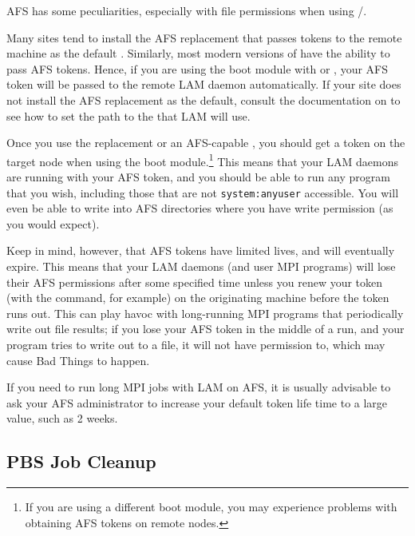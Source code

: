 AFS has some peculiarities, especially with file permissions when
using /.  

Many sites tend to install the AFS  replacement that passes
tokens to the remote machine as the default .  Similarly,
most modern versions of  have the ability to pass AFS tokens.
Hence, if you are using the  boot module with  or
, your AFS token will be passed to the remote LAM daemon
automatically.  If your site does not install the AFS replacement
 as the default, consult the documentation on
 to see how to set the path to the  that
LAM will use.

Once you use the replacement  or an AFS-capable ,
you should get a token on the target node when using the 
boot module.\footnote{If you are using a different boot module, you
  may experience problems with obtaining AFS tokens on remote nodes.}
This means that your LAM daemons are running with your AFS token, and
you should be able to run any program that you wish, including those
that are not {\tt system:anyuser} accessible.  You will even be able
to write into AFS directories where you have write permission (as you
would expect).

Keep in mind, however, that AFS tokens have limited lives, and will
eventually expire.  This means that your LAM daemons (and user MPI
programs) will lose their AFS permissions after some specified time
unless you renew your token (with the  command, for example)
on the originating machine before the token runs out.  This can play
havoc with long-running MPI programs that periodically write out file
results; if you lose your AFS token in the middle of a run, and your
program tries to write out to a file, it will not have permission to,
which may cause Bad Things to happen.

If you need to run long MPI jobs with LAM on AFS, it is usually
advisable to ask your AFS administrator to increase your default token
life time to a large value, such as 2 weeks.



\subsection{PBS Job Cleanup}
\label{sec:releasenotes:usage:pbs}

